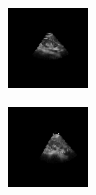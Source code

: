 \begin{figure}[htb]
\begin{subfigure}[b]{0.245\textwidth}
        \end{subfigure}%
        \begin{subfigure}[b]{0.245\textwidth}
                \centering
                \includegraphics[width=\linewidth]{img_seg/72_post}
        \end{subfigure}%
        \begin{subfigure}[b]{0.245\textwidth}
                \centering
                \includegraphics[width=\linewidth]{img_seg/75_post}
        \end{subfigure}
        

\end{figure}
